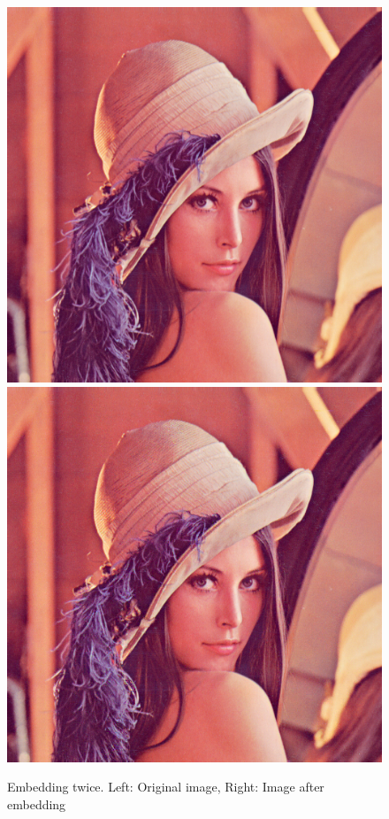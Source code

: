 \documentclass[12pt]{article}
\begin{document}
\begin{figure}[h]
\centerline{%
\includegraphics[scale=0.45]{"lena"}%
\hspace{0.1cm}
\includegraphics[scale=0.45]{"Lena Embed twice 0.7 threshold/finalImage"}%
}%
\caption{Embedding twice. Left: Original image, Right: Image after embedding}
\label{fig:lenaEmbedTwiceEmbedding}
\end{figure}
\end{document}
